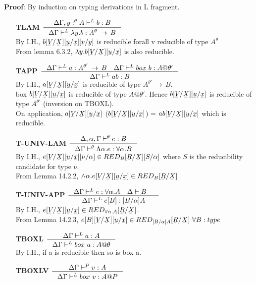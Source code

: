 \documentclass[12pt]{article}
\newcommand{\ub}[1]{\underaccent{\bar}{#1}}
\newcommand{\arr}{\ensuremath{\,\rightarrow\,}}
\begin{document}
\textbf{Proof}: By induction on typing derivations in L fragment.\\
\begin{itemize}
\item[\textbf{TLAM}]$\inference{\Delta\Gamma,y:^\theta A\vdash^Lb:B}{\Delta\Gamma\vdash^L\lambda y.b:A^\theta\arr B}$\\
By I.H., $b[\ub{V}/\ub{X}][\ub{u}/\ub{x}][v/y]$ is reducible forall v reducible of type $A^\theta$\\
From lemma 6.3.2, $\lambda y.b[\ub{V}/\ub{X}][\ub{u}/\ub{x}]$ is also reducible.
\item[\textbf{TAPP}]$\inference{\Delta\Gamma\vdash^La:A^{\theta'}\arr B \quad \Delta\Gamma\vdash^L box\ b:A@\theta'}{\Delta\Gamma\vdash^Lab:B}$\\
By I.H., $a[\ub{V}/\ub{X}][\ub{u}/\ub{x}]$ is reducible of type $A^{\theta'}\arr B$.\\
box $b[\ub{V}/\ub{X}][\ub{u}/\ub{x}]$ is reducible of type $A@\theta'$.
Hence $b[\ub{V}/\ub{X}][\ub{u}/\ub{x}]$ is reducible of type $A^{\theta'}$ (inversion on TBOXL).\\
On application, $a[\ub{V}/\ub{X}][\ub{u}/\ub{x}]$ ($b[\ub{V}/\ub{X}][\ub{u}/\ub{x}]$) = $ab[\ub{V}/\ub{X}][\ub{u}/\ub{x}]$ which is reducible.
\item[\textbf{T-UNIV-LAM}]$\inference{\Delta,\alpha,\Gamma \vdash^{\theta} e:B}{\Delta\Gamma
  \vdash^{\theta} \Lambda \alpha.e:\forall \alpha.B}$\\
By I.H., $e[\ub{V}/\ub{X}][\ub{u}/\ub{x}][\nu/\alpha] \in RED_B[\ub{R}/\ub{X}][S/\alpha]$ where $S$ is the reducibility candidate for type $\nu$.\\
From Lemma 14.2.2, $\wedge \alpha.e[\ub{V}/\ub{X}][\ub{u}/\ub{x}] \in RED_B[\ub{R}/\ub{X}]$
\item[\textbf{T-UNIV-APP}]$ \inference{\Delta\Gamma \vdash^{L} e:\forall \alpha.A \quad \Delta \vdash
B \quad }{\Delta\Gamma \vdash^{L} e[B]:[B/\alpha]A}  $\\
By I.H., $e[\ub{V}/\ub{X}][\ub{u}/\ub{x}] \in RED_{\forall\alpha.A}[\ub{R}/\ub{X}]$.\\
From Lemma 14.2.3, $e[B][\ub{V}/\ub{X}][\ub{u}/\ub{x}] \in RED_{[B/\alpha]A}[\ub{R}/\ub{X}]\ \forall B:type$\\
\item[\textbf{TBOXL}]$\inference{\Delta\Gamma \vdash^L a:A}{\Delta\Gamma \vdash^L box\ a:A@\theta}$\\
By I.H., if a is reducible then so is box a.\\
\item[\textbf{TBOXLV}]$\inference{\Delta\Gamma \vdash^P v:A}{\Delta\Gamma \vdash^L box\ v:A@P}$\\

\end{itemize}
\end{document}
